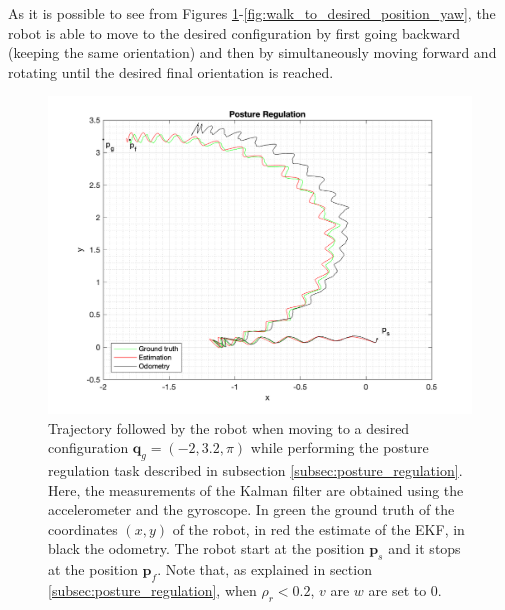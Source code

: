 \documentclass[a4paper]{article}
\begin{document}
As it is possible to see from Figures
\ref{fig:walk_to_desired_position}-\ref{fig:walk_to_desired_position_yaw},
the robot is able to move to the desired configuration by first going
backward (keeping the same orientation) and then by simultaneously moving forward
and rotating until the desired final orientation is reached.
\begin{figure}
    \centering
    \includegraphics[width=\textwidth]{images/posture_regulation.png}
    \caption{Trajectory followed by the robot when moving to a desired configuration
        $\bm{q}_g = (-2, 3.2, \pi)$ while performing the posture regulation task
        described in subsection \ref{subsec:posture_regulation}.
        Here, the measurements of the Kalman filter are obtained
        using the accelerometer and the gyroscope. In green the ground truth of the coordinates $(x, y)$ of the
        robot, in red the estimate of the EKF, in black the odometry. The robot start at the
        position $\bm{p}_s$ and it stops at the position $\bm{p}_f$. Note that,
        as explained in section \ref{subsec:posture_regulation},
        when $\rho_r < 0.2$, $v$ are $w$ are set to 0.}
    \label{fig:walk_to_desired_position}
\end{figure}
\end{document}
